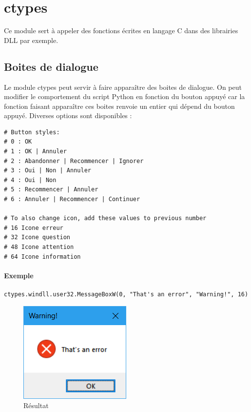 \documentclass[a4paper, 10pt]{article}
\begin{document}
\section{ctypes}
 Ce module sert à appeler des fonctions écrites en langage C dans des librairies DLL par exemple.
\subsection{Boites de dialogue}
 Le module ctypes peut servir à faire apparaître des boites de dialogue. On peut modifier le comportement du script Python en fonction du bouton appuyé car la fonction faisant apparaître ces boites renvoie un entier qui dépend du bouton appuyé. Diverses options sont disponibles :
\begin{verbatim}
# Button styles:
# 0 : OK
# 1 : OK | Annuler
# 2 : Abandonner | Recommencer | Ignorer
# 3 : Oui | Non | Annuler
# 4 : Oui | Non
# 5 : Recommencer | Annuler
# 6 : Annuler | Recommencer | Continuer

# To also change icon, add these values to previous number
# 16 Icone erreur
# 32 Icone question
# 48 Icone attention
# 64 Icone information
\end{verbatim}

\paragraph{Exemple}
\begin{verbatim}
ctypes.windll.user32.MessageBoxW(0, "That's an error", "Warning!", 16)
\end{verbatim}
\begin{figure}[h]
\begin{center}
\includegraphics[scale=0.5]{errorwindow.png}
\caption*{Résultat}
\end{center}
\end{figure}
\end{document}
